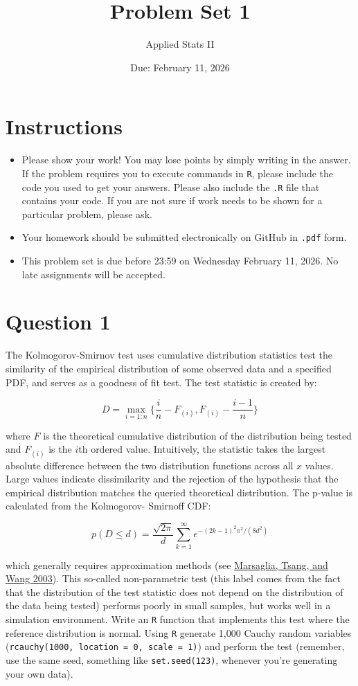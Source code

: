 \documentclass[12pt,letterpaper]{article}
\title{Problem Set 1}
\date{Due: February 11, 2026}
\author{Applied Stats II}
\begin{document}
	\maketitle
	\section*{Instructions}
	\begin{itemize}
		\item Please show your work! You may lose points by simply writing in the answer. If the problem requires you to execute commands in \texttt{R}, please include the code you used to get your answers. Please also include the \texttt{.R} file that contains your code. If you are not sure if work needs to be shown for a particular problem, please ask.
		\item Your homework should be submitted electronically on GitHub in \texttt{.pdf} form.
		\item This problem set is due before 23:59 on Wednesday February 11, 2026. No late assignments will be accepted.
	\end{itemize}
	
	\vspace{.25cm}
	\section*{Question 1}
	\vspace{.25cm}
	\noindent The Kolmogorov-Smirnov test uses cumulative distribution statistics test the similarity of the empirical distribution of some observed data and a specified PDF, and serves as a goodness of fit test. The test statistic is created by:
	
	$$D = \max_{i=1:n} \Big\{ \frac{i}{n}  - F_{(i)}, F_{(i)} - \frac{i-1}{n} \Big\}$$
	
	\noindent where $F$ is the theoretical cumulative distribution of the distribution being tested and $F_{(i)}$ is the $i$th ordered value. Intuitively, the statistic takes the largest absolute difference between the two distribution functions across all $x$ values. Large values indicate dissimilarity and the rejection of the hypothesis that the empirical distribution matches the queried theoretical distribution. The p-value is calculated from the Kolmogorov-
	Smirnoff CDF:
	
	$$p(D \leq d)= \frac{\sqrt {2\pi}}{d} \sum _{k=1}^{\infty }e^{-(2k-1)^{2}\pi ^{2}/(8d^{2})}$$
	
	
	\noindent which generally requires approximation methods (see \href{https://core.ac.uk/download/pdf/25787785.pdf}{Marsaglia, Tsang, and Wang 2003}). This so-called non-parametric test (this label comes from the fact that the distribution of the test statistic does not depend on the distribution of the data being tested) performs poorly in small samples, but works well in a simulation environment. Write an \texttt{R} function that implements this test where the reference distribution is normal. Using \texttt{R} generate 1,000 Cauchy random variables (\texttt{rcauchy(1000, location = 0, scale = 1)}) and perform the test (remember, use the same seed, something like \texttt{set.seed(123)}, whenever you're generating your own data).\\
	
\end{document}
